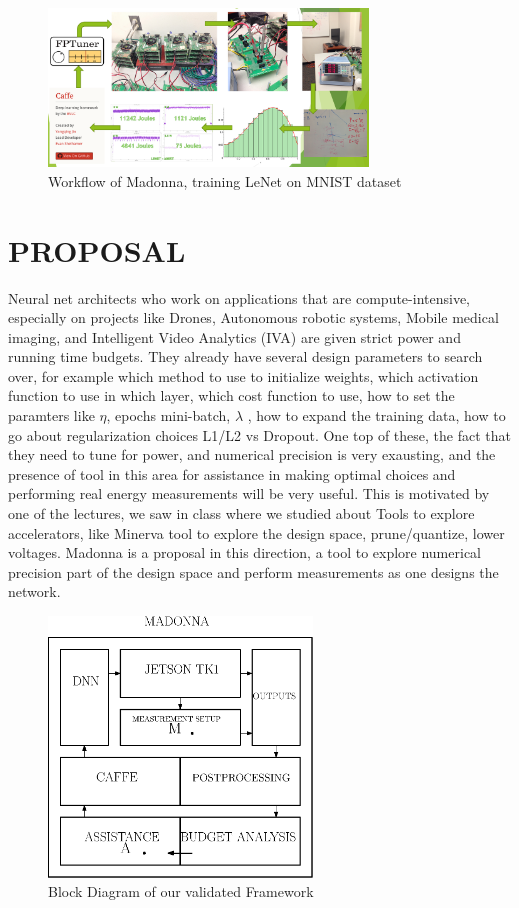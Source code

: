 \documentclass[letterpaper, 10 pt, conference]{ieeeconf}
\begin{document}
          \begin{figure}[h]
              \centering
              \includegraphics[width=85mm,scale=1]{wf}
              \caption{Workflow of Madonna, training LeNet on MNIST dataset}
              \label{q1}
          \end{figure}



\section{PROPOSAL}
         
Neural net architects who work on applications that are compute-intensive, especially on projects like Drones, Autonomous robotic systems, Mobile medical imaging, and Intelligent Video Analytics (IVA) are given strict power and running time budgets. They already have several design parameters to search over, for example which method to use to initialize weights, which activation function to use in which layer, which cost function to use, how to set the paramters like $\eta$, epochs mini-batch, $\lambda$ , how to expand the training data, how to go about regularization choices L1/L2 vs Dropout. 
One top of these, the fact that they need to tune for power, and numerical precision is very exausting, and the presence of tool in this area for assistance in making optimal choices and performing real energy measurements will be very useful. This is motivated by one of the lectures, we saw in class where we studied about Tools to explore accelerators, like Minerva tool to explore the design space, prune/quantize, lower voltages.
Madonna is a proposal in this direction, a tool to explore numerical precision part of the design space and perform measurements as one designs the network.

\begin{figure}[h]
  \centering
  \includegraphics[width=70mm,scale=1]{frame}
  \caption{Block Diagram of our validated Framework}
  \label{fig:frame}
\end{figure}
\end{document}
